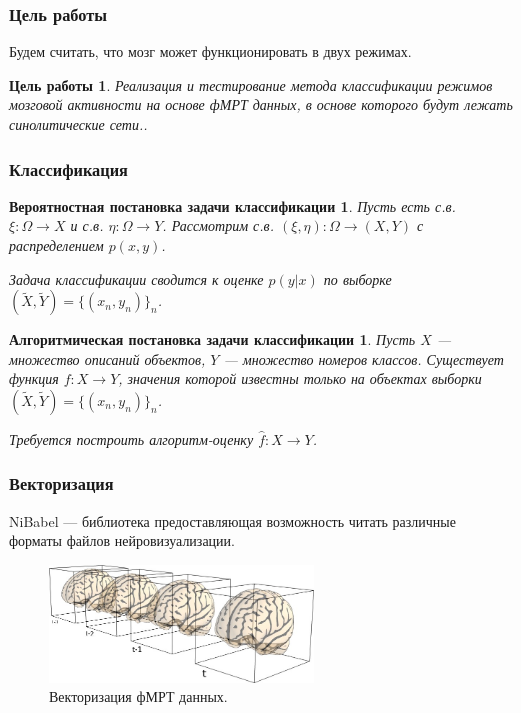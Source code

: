 \documentclass{beamer}
\newtheorem{target_}{Цель работы}
\newtheorem{prob_task}{Вероятностная постановка задачи классификации}
\newtheorem{algo_task}{Алгоритмическая постановка задачи классификации}
\begin{document}
	\begin{frame} 
		\frametitle{Цель работы}
		Будем считать, что мозг может функционировать в двух режимах.
		
		\begin{target_}
			Реализация и тестирование метода классификации режимов мозговой активности на основе фМРТ данных, в основе которого будут лежать синолитические сети..
		\end{target_}			
	\end{frame}

	\begin{frame} 
		\frametitle{Классификация}
		\begin{prob_task}
			Пусть есть с.в. $\xi: \Omega \rightarrow X$ и с.в. $\eta: \Omega \rightarrow Y$. Рассмотрим с.в. $(\xi, \eta): \Omega \rightarrow (X, Y)$ с распределением $p(x, y)$.
			\vspace{0.5cm}
			
			Задача классификации сводится к оценке $p(y|x)$ по выборке $(\widetilde{X}, \widetilde{Y}) = \{(x_{n}, y_{n})\}_n$.
		\end{prob_task}
	
		\begin{algo_task}
			Пусть $X$ --- множество описаний объектов, $Y$ --- множество номеров классов. Существует функция $f: X \rightarrow Y$, значения которой известны только на объектах выборки $(\widetilde{X}, \widetilde{Y}) =  \{(x_{n}, y_{n})\}_n$. 
			\vspace{0.5cm}
			
			Требуется построить алгоритм-оценку $\widehat{f}: X \rightarrow Y$.
		\end{algo_task}
	\end{frame}

	\begin{frame} 	
		\frametitle{Векторизация}	
		
		NiBabel --- библиотека предоставляющая возможность читать различные форматы файлов нейровизуализации.
		\vspace{0.5cm}
				
		\begin{figure}
			\includegraphics[width=7cm]{../images/vectorization_1.png}
			\caption{Векторизация фМРТ данных.} 
			\label{fg:5}
		\end{figure}
	\end{frame}
	
\end{document}
